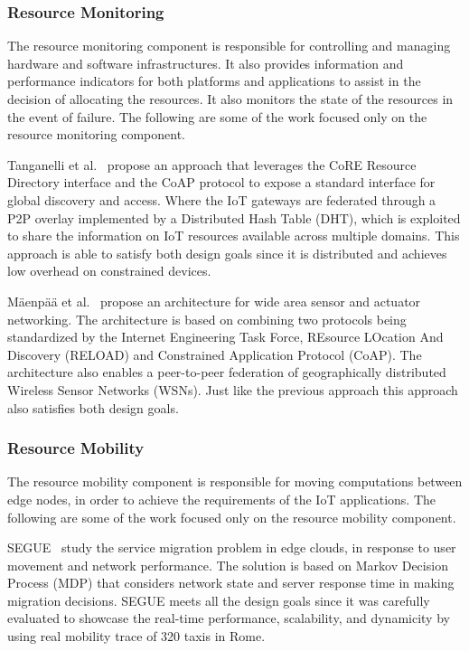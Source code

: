 \subsubsection{Resource Monitoring}
The resource monitoring component is responsible for controlling and managing hardware and software infrastructures. It also provides information and performance indicators for both platforms and applications to assist in the decision of allocating the resources. It also monitors the state of the resources in the event of failure. The following are some of the work focused only on the resource monitoring component.

Tanganelli et al.~\cite{8086146} propose an approach that leverages the CoRE Resource Directory interface and the CoAP protocol to expose a standard interface for global discovery and access. Where the IoT gateways are federated through a P2P overlay implemented by a Distributed Hash Table (DHT), which is exploited to share the information on IoT resources available across multiple domains. This approach is able to satisfy both design goals since it is distributed and achieves low overhead on constrained devices.

M{\"a}enp{\"a}{\"a} et al.~\cite{Maenpaa2012} propose an architecture for wide area sensor and actuator networking. The architecture is based on combining two protocols being standardized by the Internet Engineering Task Force, REsource LOcation And Discovery (RELOAD) and Constrained Application Protocol (CoAP). The architecture also enables a peer-to-peer federation of geographically distributed Wireless Sensor Networks (WSNs). Just like the previous approach this approach also satisfies both design goals.

\subsubsection{Resource Mobility}
The resource mobility component is responsible for moving computations between edge nodes, in order to achieve the requirements of the IoT applications. The following are some of the work focused only on the resource mobility component.

SEGUE~\cite{SEGUE} study the service migration problem in edge clouds, in response to user movement and network performance. The solution is based on Markov Decision Process (MDP) that considers network state and server response time in making migration decisions. SEGUE meets all the design goals since it was carefully evaluated to showcase the real-time performance, scalability, and dynamicity by using real mobility trace of 320 taxis in Rome. 

